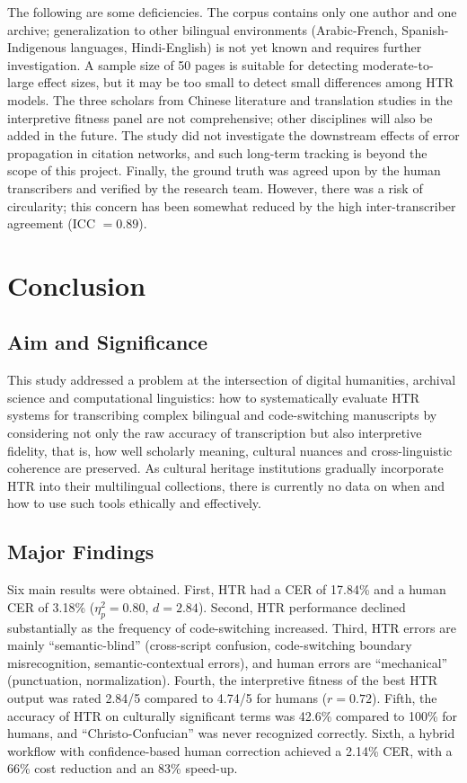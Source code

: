 \documentclass[final]{anthology-ch} %
\begin{document}
The following are some deficiencies. The corpus contains only one author and one archive; generalization to other bilingual environments (Arabic-French, Spanish-Indigenous languages, Hindi-English) is not yet known and requires further investigation. A sample size of 50 pages is suitable for detecting moderate-to-large effect sizes, but it may be too small to detect small differences among HTR models. The three scholars from Chinese literature and translation studies in the interpretive fitness panel are not comprehensive; other disciplines will also be added in the future. The study did not investigate the downstream effects of error propagation in citation networks, and such long-term tracking is beyond the scope of this project. Finally, the ground truth was agreed upon by the human transcribers and verified by the research team. However, there was a risk of circularity; this concern has been somewhat reduced by the high inter-transcriber agreement (ICC $= 0.89$).

\section{Conclusion} \label{sec:conclusion}

\subsection{Aim and Significance}

This study addressed a problem at the intersection of digital humanities, archival science and computational linguistics: how to systematically evaluate HTR systems for transcribing complex bilingual and code-switching manuscripts by considering not only the raw accuracy of transcription but also interpretive fidelity, that is, how well scholarly meaning, cultural nuances and cross-linguistic coherence are preserved. As cultural heritage institutions gradually incorporate HTR into their multilingual collections, there is currently no data on when and how to use such tools ethically and effectively.

\subsection{Major Findings}

Six main results were obtained. First, HTR had a CER of 17.84\% and a human CER of 3.18\% ($\eta^2_p = 0.80$, $d = 2.84$). Second, HTR performance declined substantially as the frequency of code-switching increased. Third, HTR errors are mainly \enquote{semantic-blind} (cross-script confusion, code-switching boundary misrecognition, semantic-contextual errors), and human errors are \enquote{mechanical} (punctuation, normalization). Fourth, the interpretive fitness of the best HTR output was rated 2.84/5 compared to 4.74/5 for humans ($r = 0.72$). Fifth, the accuracy of HTR on culturally significant terms was 42.6\% compared to 100\% for humans, and \enquote{Christo-Confucian} was never recognized correctly. Sixth, a hybrid workflow with confidence-based human correction achieved a 2.14\% CER, with a 66\% cost reduction and an 83\% speed-up.
\end{document}
